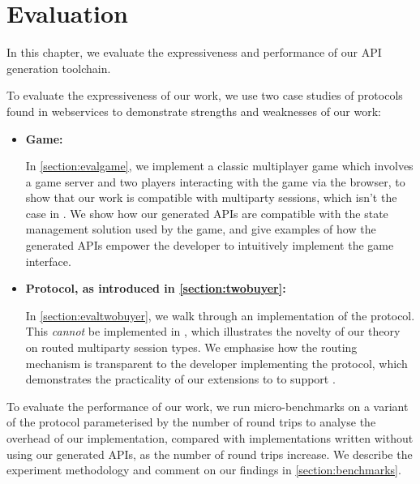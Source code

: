 \chapter{Evaluation}
\label{chap:eval}

In this chapter, we
evaluate the expressiveness
and performance of our API generation
toolchain.


To evaluate the expressiveness
of our work,
we use two case studies
of protocols found in webservices
to demonstrate strengths and weaknesses
of our work:

\begin{itemize}

\item
\textbf{ Game:}

In \cref{section:evalgame},
we implement a classic multiplayer game which involves a game server
and two players interacting with the game via the browser,
to show that our work is compatible with multiparty sessions,
which isn't the case in \cite{MVU2020,Exceptional}.
We show how our generated APIs are compatible with the
state management solution used by the game, and give examples of 
how the generated APIs empower the developer to intuitively 
implement the game interface.

\item
\textbf{ Protocol, as introduced in \cref{section:twobuyer}:}

In \cref{section:evaltwobuyer},
we walk through an implementation of the 
protocol. This \textit{cannot} be implemented in
\cite{PureScript2019,MVU2020}, which illustrates the novelty
of our \newtheory theory on routed multiparty session types.
We emphasise how the routing mechanism is transparent to the
developer implementing the protocol, which demonstrates
the practicality of our extensions to \codegen to support
\newtheory.

\end{itemize}

To evaluate the performance of our work,
we run micro-benchmarks
on a variant of the 
protocol parameterised by the number
of round trips
to analyse the overhead of our implementation,
compared with implementations written
without using our generated APIs,
as the number of round trips increase.
We describe the experiment methodology
and comment on our findings in \cref{section:benchmarks}.





% 


